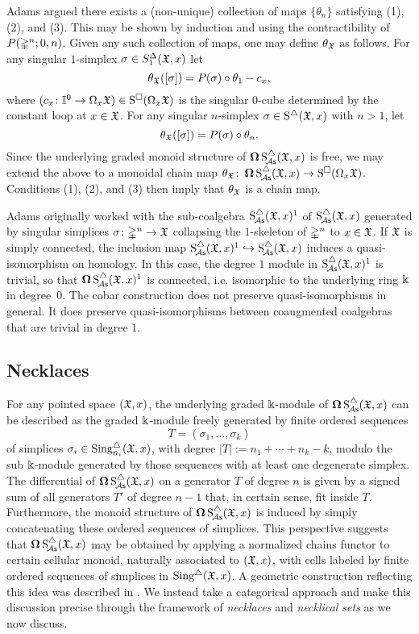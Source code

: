 Adams argued there exists a (non-unique) collection of maps $\{\theta_n\}$ satisfying (1), (2), and (3).
This may be shown by induction and using the contractibility of $P(\mathbb{\Delta}^n; 0,n)$.
Given any such collection of maps, one may define $\theta_{\mathfrak{X}}$ as follows.
For any singular $1$-simplex $\sigma \in S^{\Delta}_1(\mathfrak{X},x)$ let
\[
\theta_{\mathfrak{X}}([\sigma]) = P(\sigma) \circ \theta_1 - c_x,
\]
where $(c_x \colon \mathbb{I}^0 \to \Omega_x \mathfrak{X}) \in \operatorname{S^{\square}}(\Omega_x \mathfrak{X})$ is the singular $0$-cube determined by the constant loop at $x \in \mathfrak{X}$.
For any singular $n$-simplex $\sigma \in \operatorname{S^{\triangle}}(\mathfrak{X},x)$ with $n>1$, let
\[
\theta_{\mathfrak{X}}([\sigma]) = P(\sigma) \circ \theta_n.
\]
Since the underlying graded monoid structure of $\operatorname{\mathbf{\Omega}} \operatorname{S^{\triangle}_{\!{\mathcal{A}\mathsf{s}}}}(\mathfrak{X},x)$ is free, we may extend the above to a monoidal chain map $\theta_{\mathfrak{X}} \colon \operatorname{\mathbf{\Omega}} \operatorname{S^{\triangle}_{\!{\mathcal{A}\mathsf{s}}}}(\mathfrak{X},x) \to \operatorname{S^{\square}}(\Omega_x \mathfrak{X})$.
Conditions (1), (2), and (3) then imply that $\theta_{\mathfrak{X}}$ is a chain map.

\begin{remark}
	Adams originally worked with the sub-coalgebra $\operatorname{S^{\triangle}_{\!{\mathcal{A}\mathsf{s}}}}(\mathfrak{X},x)^1$ of $\operatorname{S^{\triangle}_{\!{\mathcal{A}\mathsf{s}}}}(\mathfrak{X},x)$ generated by singular simplices $\sigma \colon \mathbb{\Delta}^n \to \mathfrak{X}$ collapsing the $1$-skeleton of $\mathbb{\Delta}^n$ to $x \in \mathfrak{X}$.
	If $\mathfrak{X}$ is simply connected, the inclusion map $\operatorname{S^{\triangle}_{\!{\mathcal{A}\mathsf{s}}}}(\mathfrak{X},x)^1 \hookrightarrow \operatorname{S^{\triangle}_{\!{\mathcal{A}\mathsf{s}}}}(\mathfrak{X},x)$ induces a quasi-isomorphism on homology.
	In this case, the degree $1$ module in $\operatorname{S^{\triangle}_{\!{\mathcal{A}\mathsf{s}}}}(\mathfrak{X},x)^1$ is trivial, so that $\operatorname{\mathbf{\Omega}} \operatorname{S^{\triangle}_{\!{\mathcal{A}\mathsf{s}}}}(\mathfrak{X},x)^1$ is connected, i.e.
	isomorphic to the underlying ring $\Bbbk$ in degree~$0$.
	The cobar construction does not preserve quasi-isomorphisms in general.
	It does preserve quasi-isomorphisms between coaugmented coalgebras that are trivial in degree $1$.
\end{remark}

\subsection{Necklaces}

For any pointed space $(\mathfrak{X},x)$, the underlying graded $\Bbbk$-module of $\operatorname{\mathbf{\Omega}} \operatorname{S^{\triangle}_{\!{\mathcal{A}\mathsf{s}}}}(\mathfrak{X},x)$ can be described as the graded $\Bbbk$-module freely generated by finite ordered sequences
\[
T = (\sigma_1, \dots, \sigma_k)
\]
of simplices $\sigma_i \in \text{Sing}^{\triangle}_{n_i}(\mathfrak{X},x)$, with degree $|T|:= n_1 + \cdots + n_k -k$, modulo the sub $\Bbbk$-module generated by those sequences with at least one degenerate simplex.
The differential of $\operatorname{\mathbf{\Omega}} \operatorname{S^{\triangle}_{\!{\mathcal{A}\mathsf{s}}}}(\mathfrak{X},x)$ on a generator $T$ of degree $n$ is given by a signed sum of all generators $T'$ of degree $n-1$ that, in certain sense, fit inside $T$.
Furthermore, the monoid structure of $\operatorname{\mathbf{\Omega}} \operatorname{S^{\triangle}_{\!{\mathcal{A}\mathsf{s}}}}(\mathfrak{X},x)$ is induced by simply concatenating these ordered sequences of simplices.
This perspective suggests that $\operatorname{\mathbf{\Omega}} \operatorname{S^{\triangle}_{\!{\mathcal{A}\mathsf{s}}}}(\mathfrak{X},x)$ may be obtained by applying a normalized chains functor to certain cellular monoid, naturally associated to $(\mathfrak{X},x)$, with cells labeled by finite ordered sequences of simplices in $\operatorname{Sing^{\triangle}}(\mathfrak{X},x)$.
A geometric construction reflecting this idea was described in \cite{baues1980geometry}.
We instead take a categorical approach and make this discussion precise through the framework of \textit{necklaces} and \textit{necklical sets} as we now discuss.

